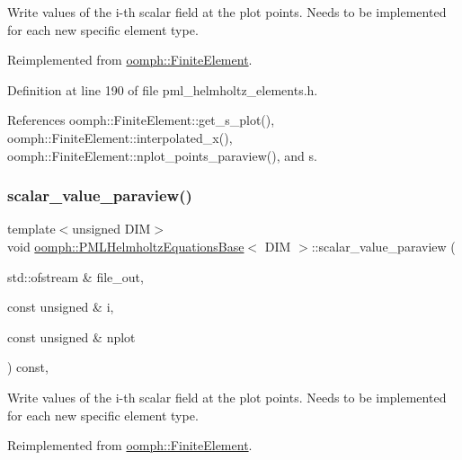 Write values of the i-\/th scalar field at the plot points. Needs to be implemented for each new specific element type. 



Reimplemented from \hyperlink{classoomph_1_1FiniteElement_ac6ce34f52481195e8dba634618ef3f36}{oomph\+::\+Finite\+Element}.



Definition at line 190 of file pml\+\_\+helmholtz\+\_\+elements.\+h.



References oomph\+::\+Finite\+Element\+::get\+\_\+s\+\_\+plot(), oomph\+::\+Finite\+Element\+::interpolated\+\_\+x(), oomph\+::\+Finite\+Element\+::nplot\+\_\+points\+\_\+paraview(), and s.

\mbox{\label{classoomph_1_1PMLHelmholtzEquationsBase_aaeb408e55bccd67d03e70fe85cb1de9d}} 
\subsubsection{\texorpdfstring{scalar\+\_\+value\+\_\+paraview()}{scalar\_value\_paraview()}}
{\footnotesize\ttfamily template$<$unsigned D\+IM$>$ \\
void \hyperlink{classoomph_1_1PMLHelmholtzEquationsBase}{oomph\+::\+P\+M\+L\+Helmholtz\+Equations\+Base}$<$ D\+IM $>$\+::scalar\+\_\+value\+\_\+paraview (\begin{DoxyParamCaption}\item[{std\+::ofstream \&}]{file\+\_\+out,  }\item[{const unsigned \&}]{i,  }\item[{const unsigned \&}]{nplot }\end{DoxyParamCaption}) const\hspace{0.3cm}{\ttfamily [inline]}, {\ttfamily [virtual]}}



Write values of the i-\/th scalar field at the plot points. Needs to be implemented for each new specific element type. 



Reimplemented from \hyperlink{classoomph_1_1FiniteElement_a02cf8832a5e2886f1572bd36f7a7c1e3}{oomph\+::\+Finite\+Element}.



